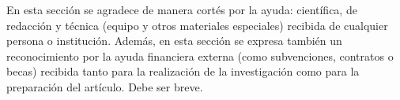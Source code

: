 \documentclass[11pt]{article}
\begin{document}

\begin{acknowledgements} 
  En esta sección se agradece de manera cortés por la ayuda: científica, de redacción y 
técnica (equipo y otros materiales especiales) recibida de cualquier persona o institución. Además, en 
esta sección se expresa también un reconocimiento por la ayuda financiera externa (como 
subvenciones, contratos o becas) recibida tanto para la realización de la investigación como para la 
preparación del artículo. Debe ser breve.
\end{acknowledgements}





\end{document}
